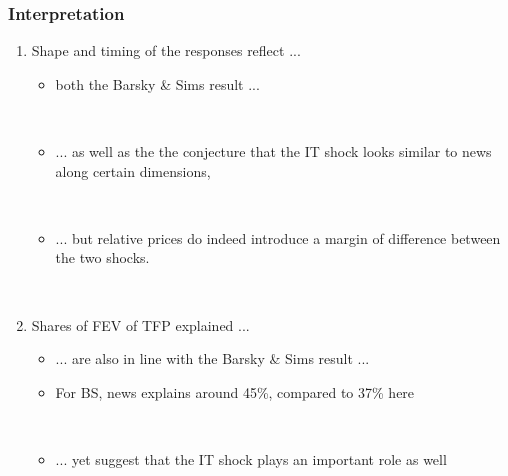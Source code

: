 \documentclass{beamer}
\begin{document}
\begin{frame}
	\frametitle{Interpretation}

\begin{enumerate}
 \item Shape and timing of the responses reflect ...
 
 
	\begin{itemize}
	\item both the Barsky \& Sims result ...
	
	\
	
	\item ... as well as the the conjecture that the IT shock looks similar to news along certain dimensions, 
	
	\
	
	\item ... but relative prices do indeed introduce a margin of difference between the two shocks.
	\end{itemize}

\

\item Shares of FEV of TFP explained ...
	\begin{itemize}
	\item ... are also in line with the Barsky \& Sims result ...
	\item [] For BS, news explains around 45\%, compared to 37\% here
	
	\
	
	\item ... yet suggest that the IT shock plays an important role as well
	\end{itemize}

\end{enumerate}
		 	
\end{frame}
\end{document}
